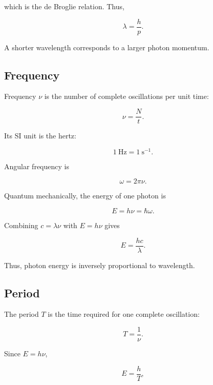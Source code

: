 \documentclass[12pt]{article}
\begin{document}
which is the de Broglie relation. Thus,

\begin{equation}
\boxed{\lambda=\frac{h}{p}}.
\end{equation}

A shorter wavelength corresponds to a larger photon momentum.

\subsection{Frequency}

Frequency $\nu$ is the number of complete oscillations per unit time:

\begin{equation}
\nu=\frac{N}{t}.
\end{equation}

Its SI unit is the hertz:

\begin{equation}
1~\mathrm{Hz}=1~\mathrm{s}^{-1}.
\end{equation}

Angular frequency is

\begin{equation}
\omega=2\pi\nu.
\end{equation}

Quantum mechanically, the energy of one photon is

\begin{equation}
\boxed{E=h\nu=\hbar\omega}.
\end{equation}

Combining $c=\lambda\nu$ with $E=h\nu$ gives

\begin{equation}
\boxed{E=\frac{hc}{\lambda}}.
\end{equation}

Thus, photon energy is inversely proportional to wavelength.

\subsection{Period}

The period $T$ is the time required for one complete oscillation:

\begin{equation}
T=\frac{1}{\nu}.
\end{equation}

Since $E=h\nu$,

\begin{equation}
E=\frac{h}{T},
\end{equation}
\end{document}
